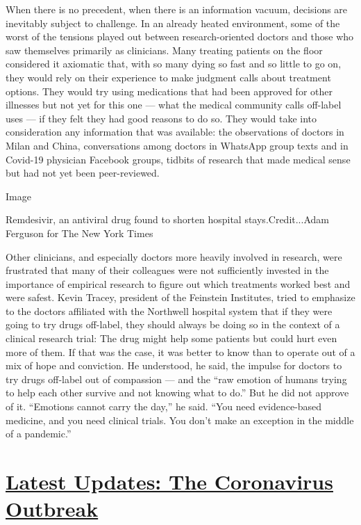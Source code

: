 When there is no precedent, when there is an information vacuum,
decisions are inevitably subject to challenge. In an already heated
environment, some of the worst of the tensions played out between
research-oriented doctors and those who saw themselves primarily as
clinicians. Many treating patients on the floor considered it axiomatic
that, with so many dying so fast and so little to go on, they would rely
on their experience to make judgment calls about treatment options. They
would try using medications that had been approved for other illnesses
but not yet for this one --- what the medical community calls off-label
uses --- if they felt they had good reasons to do so. They would take
into consideration any information that was available: the observations
of doctors in Milan and China, conversations among doctors in WhatsApp
group texts and in Covid-19 physician Facebook groups, tidbits of
research that made medical sense but had not yet been peer-reviewed.

Image

Remdesivir, an antiviral drug found to shorten hospital
stays.Credit...Adam Ferguson for The New York Times

Other clinicians, and especially doctors more heavily involved in
research, were frustrated that many of their colleagues were not
sufficiently invested in the importance of empirical research to figure
out which treatments worked best and were safest. Kevin Tracey,
president of the Feinstein Institutes, tried to emphasize to the doctors
affiliated with the Northwell hospital system that if they were going to
try drugs off-label, they should always be doing so in the context of a
clinical research trial: The drug might help some patients but could
hurt even more of them. If that was the case, it was better to know than
to operate out of a mix of hope and conviction. He understood, he said,
the impulse for doctors to try drugs off-label out of compassion --- and
the ``raw emotion of humans trying to help each other survive and not
knowing what to do.'' But he did not approve of it. ``Emotions cannot
carry the day,'' he said. ``You need evidence-based medicine, and you
need clinical trials. You don't make an exception in the middle of a
pandemic.''

\hypertarget{latest-updates-the-coronavirus-outbreak}{%
\section{\texorpdfstring{\href{https://www.nytimes.com/2020/08/07/world/covid-19-news.html?action=click\&pgtype=Article\&state=default\&region=MAIN_CONTENT_1\&context=storylines_live_updates}{Latest
Updates: The Coronavirus
Outbreak}}{Latest Updates: The Coronavirus Outbreak}}\label{latest-updates-the-coronavirus-outbreak}}

